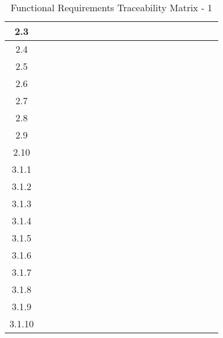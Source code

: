 \documentclass[titlepage]{article}
\begin{document}
\begin{center}
\begin{table}[h!]
\begin{tabular}{|c|c|c|c|c |c|c|c|c|c |c|c|c|c|c |c|c|c|c|c|}
2.3 &&&& &&&&& &&&&& &&&&&\\\hline
2.4 &&&& &&&&& &&&&& &&&&&\\\hline
2.5 &&&& &&&&& &&&&& &&&&&\\\hline
2.6 &&&& &&&&& &&&&& &&&&&\\\hline
2.7 &&&& &&&&& &&&&& &&&&&\\\hline
2.8 &&&& &&&&& &&&&& &&&&&\\\hline
2.9 &&&& &&&&& &&&&& &&&&&\\\hline
2.10 &&&& &&&&& &&&&& &&&&&\\\hline
3.1.1 &&&& &&&&& &&&&& &&&&&\\\hline
3.1.2 &&&& &&&&& &&&&& &&&&&\\\hline
3.1.3 &&&& &&&&& &&&&& &&&&&\\\hline
3.1.4 &&&& &&&&& &&&&& &&&&&\\\hline
3.1.5 &&&& &&&&& &&&&& &&&&&\\\hline
3.1.6 &&&& &&&&& &&&&& &&&&&\\\hline
3.1.7 &&&& &&&&& &&&&& &&&&&\\\hline
3.1.8 &&&& &&&&& &&&&& &&&&&\\\hline
3.1.9 &&&& &&&&& &&&&& &&&&&\\\hline
3.1.10 &&&& &&&&& &&&&& &&&&&\\\hline
\end{tabular}
\caption{Functional Requirements Traceability Matrix - 1}
\end{table}
\end{center}
\end{document}
